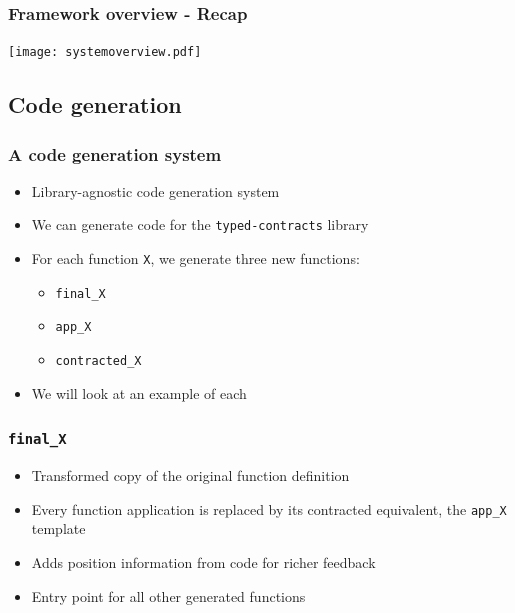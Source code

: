 \documentclass[]{beamer}
\begin{document}
\begin{frame}
\frametitle{Framework overview - Recap}

\begin{center}
\texttt{[image: systemoverview.pdf]}
\end{center}

\end{frame}

\subsection{Code generation}

\begin{frame}[fragile]
\frametitle{A code generation system}

\begin{itemize}
	\item Library-agnostic code generation system
	\item We can generate code for the \texttt{typed-contracts} library
	\item For each function \texttt{X}, we generate three new functions:
	\begin{itemize}
	\item \texttt{\underline{\hspace{1.5em}}final\_X}
	\item \texttt{\underline{\hspace{1.5em}}app\_X}
	\item \texttt{\underline{\hspace{1.5em}}contracted\_X}
	\end{itemize}
	\item We will look at an example of each
\end{itemize}

\end{frame}

\begin{frame}[fragile]
\frametitle{\texttt{\underline{\hspace{1.5em}}final\_X}}

\begin{itemize}
	\item Transformed copy of the original function definition
	\item Every function application is replaced by its contracted equivalent, the \texttt{\underline{\hspace{1.5em}}app\_X} template
	\item Adds position information from code for richer feedback
	\item Entry point for all other generated functions
\end{itemize}

\end{frame}
\end{document}
